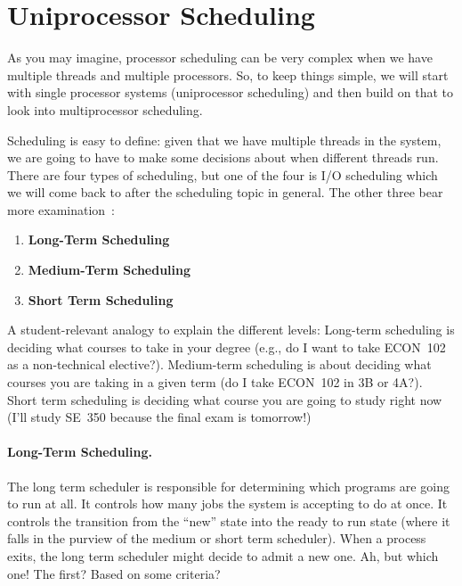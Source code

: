 




\section*{Uniprocessor Scheduling}

As you may imagine, processor scheduling can be very complex when we have multiple threads and multiple processors. So, to keep things simple, we will start with single processor systems (uniprocessor scheduling) and then build on that to look into multiprocessor scheduling.

Scheduling is easy to define: given that we have multiple threads in the system, we are going to have to make some decisions about when different threads run. There are four types of scheduling, but one of the four is I/O scheduling which we will come back to after the scheduling topic in general. The other three bear more examination~\cite{osi}:

\begin{enumerate}
	\item \textbf{Long-Term Scheduling}
	\item \textbf{Medium-Term Scheduling}
	\item \textbf{Short Term Scheduling}
\end{enumerate}

A student-relevant analogy to explain the different levels: Long-term scheduling is deciding what courses to take in your degree (e.g., do I want to take ECON~102 as a non-technical elective?). Medium-term scheduling is about deciding what courses you are taking in a given term (do I take ECON~102 in 3B or 4A?). Short term scheduling is deciding what course you are going to study right now (I'll study SE~350 because the final exam is tomorrow!)

\paragraph{Long-Term Scheduling.}

The long term scheduler is responsible for determining which programs are going to run at all. It controls how many jobs the system is accepting to do at once. It controls the transition from the ``new'' state into the ready to run state (where it falls in the purview of the medium or short term scheduler). When a process exits, the long term scheduler might decide to admit a new one. Ah, but which one! The first? Based on some criteria?

